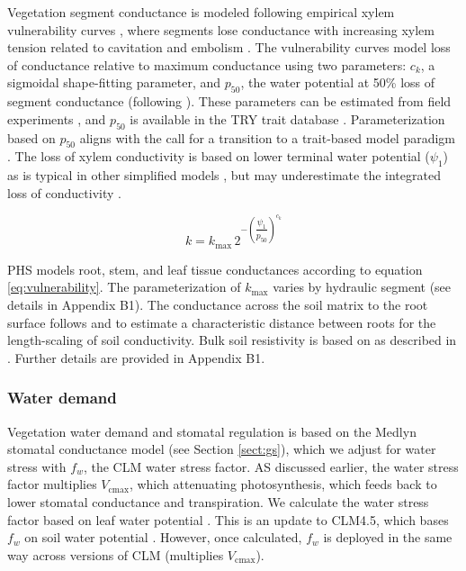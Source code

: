\documentclass[draft,linenumbers]{agujournal}
\begin{document}
     Vegetation segment conductance is modeled following empirical xylem vulnerability curves \citep{tyree1989}, 
     where segments lose conductance with increasing xylem tension related to 
     cavitation and embolism \citep{holbrook2001}.
     The vulnerability curves model loss of conductance relative to maximum conductance using two parameters: 
     $c_k$, a sigmoidal shape-fitting parameter, and 
     $p_{50}$, the water potential at 50\% loss of segment conductance (following \cite{gentine2016}). 
     These parameters can be estimated from field experiments \citep{sack2002}, 
     and $p_{50}$ is available in the TRY trait database \citep{kattge2011}.
     Parameterization based on $p_{50}$ aligns with the call for a transition to a
     trait-based model paradigm \citep{anderegg2015a}.
     The loss of xylem conductivity is based on lower terminal water potential ($\psi_1$)
     as is typical in other simplified models \citep{xu2016}, but 
     may underestimate the integrated loss of conductivity \citep{sperry2015}. 
         
     \begin{linenomath*}
     \begin{equation}
     \label{eq:vulnerability}
     k = k_{\text{max}} \, 2^{-\left(\dfrac{\psi_1}{p_{50}}\right)^{c_k}}
     \end{equation}
     \end{linenomath*}
     
     PHS models root, stem, and leaf tissue conductances according to equation \ref{eq:vulnerability}.
     The parameterization of $k_{\text{max}}$ varies by hydraulic segment (see details in Appendix B1).
     The conductance across the soil matrix to the root surface follows \citet{williams2001} and \citet{bonan2014} 
     to estimate a characteristic distance between roots for the length-scaling of soil conductivity.
     Bulk soil resistivity is based on \citet{clapp1978} as described in \citet{oleson2013}.
     Further details are provided in Appendix B1.
    
    \subsubsection{Water demand}
    \label{sect:demand}
    
    Vegetation water demand and stomatal regulation is based on the Medlyn stomatal conductance model (see Section \ref{sect:gs}), 
    which we adjust for water stress with $f_w$, the CLM water stress factor. 
    AS discussed earlier, the water stress factor multiplies $V_{\text{cmax}}$, which attenuating photosynthesis, which feeds back to lower stomatal conductance and transpiration.
    We calculate the water stress factor based on leaf water potential \citep{klein2014}.
    This is an update to CLM4.5, which bases $f_w$ on soil water potential \citep{oleson2013}.
    However, once calculated, $f_w$ is deployed in the same way across versions of CLM (multiplies $V_{\text{cmax}}$).
\end{document}
